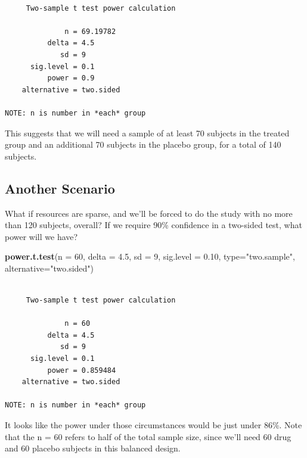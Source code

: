 \documentclass[
]{book}
\newenvironment{Shaded}{\begin{snugshade}}{\end{snugshade}}
\newcommand{\DataTypeTok}[1]{\textcolor[rgb]{0.13,0.29,0.53}{#1}}
\newcommand{\DecValTok}[1]{\textcolor[rgb]{0.00,0.00,0.81}{#1}}
\newcommand{\FloatTok}[1]{\textcolor[rgb]{0.00,0.00,0.81}{#1}}
\newcommand{\KeywordTok}[1]{\textcolor[rgb]{0.13,0.29,0.53}{\textbf{#1}}}
\newcommand{\NormalTok}[1]{#1}
\newcommand{\StringTok}[1]{\textcolor[rgb]{0.31,0.60,0.02}{#1}}
\begin{document}
\begin{verbatim}

     Two-sample t test power calculation 

              n = 69.19782
          delta = 4.5
             sd = 9
      sig.level = 0.1
          power = 0.9
    alternative = two.sided

NOTE: n is number in *each* group
\end{verbatim}

This suggests that we will need a sample of at least 70 subjects in the treated group and an additional 70 subjects in the placebo group, for a total of 140 subjects.

\hypertarget{another-scenario}{%
\subsection{Another Scenario}\label{another-scenario}}

What if resources are sparse, and we'll be forced to do the study with no more than 120 subjects, overall? If we require 90\% confidence in a two-sided test, what power will we have?

\begin{Shaded}
\begin{Highlighting}[]
\KeywordTok{power.t.test}\NormalTok{(}\DataTypeTok{n =} \DecValTok{60}\NormalTok{, }\DataTypeTok{delta =} \FloatTok{4.5}\NormalTok{, }\DataTypeTok{sd =} \DecValTok{9}\NormalTok{, }
             \DataTypeTok{sig.level =} \FloatTok{0.10}\NormalTok{,}
             \DataTypeTok{type=}\StringTok{"two.sample"}\NormalTok{, }
             \DataTypeTok{alternative=}\StringTok{"two.sided"}\NormalTok{)}
\end{Highlighting}
\end{Shaded}

\begin{verbatim}

     Two-sample t test power calculation 

              n = 60
          delta = 4.5
             sd = 9
      sig.level = 0.1
          power = 0.859484
    alternative = two.sided

NOTE: n is number in *each* group
\end{verbatim}

It looks like the power under those circumstances would be just under 86\%. Note that the n = 60 refers to half of the total sample size, since we'll need 60 drug and 60 placebo subjects in this balanced design.
\end{document}
